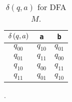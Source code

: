 \begin{table}[!ht]
    \centering
    \begin{tabular}{|c|c|c|}
        \hline
        $\delta\left( q, a \right)$ & \texttt{a} & \texttt{b} \\
        \hline
        $q_{00}$ & $q_{10}$ & $q_{01}$ \\
        \hline
        $q_{01}$ & $q_{11}$ & $q_{00}$ \\
        \hline
        $q_{10}$ & $q_{00}$ & $q_{11}$ \\
        \hline
        $q_{11}$ & $q_{01}$ & $q_{10}$ \\
        \hline
    \end{tabular}
    \caption{$\delta(q, a)$ for DFA $M$.}
    \label{tab:030305f}.
\end{table}